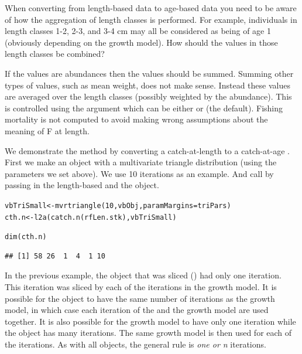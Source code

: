 \documentclass[a4paper,english,10pt]{article}\usepackage[]{graphicx}\usepackage[]{color}
\makeatletter
\newcommand{\hlnum}[1]{\textcolor[rgb]{0.063,0.58,0.627}{#1}}%
\newcommand{\hlstd}[1]{\textcolor[rgb]{0.196,0.196,0.196}{#1}}%
\newcommand{\hlkwb}[1]{\textcolor[rgb]{0.627,0,0.314}{#1}}%
\newcommand{\hlkwc}[1]{\textcolor[rgb]{0,0.631,0.314}{#1}}%
\newcommand{\hlkwd}[1]{\textcolor[rgb]{0.78,0.227,0.412}{#1}}%
\newenvironment{kframe}{%
 \def\at@end@of@kframe{}%
 \ifinner\ifhmode%
  \def\at@end@of@kframe{\end{minipage}}%
  \begin{minipage}{\columnwidth}%
 \fi\fi%
 \def\FrameCommand##1{\hskip\@totalleftmargin \hskip-\fboxsep
 \colorbox{shadecolor}{##1}\hskip-\fboxsep
     \hskip-\linewidth \hskip-\@totalleftmargin \hskip\columnwidth}%
 \MakeFramed {\advance\hsize-\width
   \@totalleftmargin\z@ \linewidth\hsize
   \@setminipage}}%
 {\par\unskip\endMakeFramed%
 \at@end@of@kframe}
\newenvironment{knitrout}{}{} %
\makeatother
\begin{document}
When converting from length-based data to age-based data you need to be aware of how the aggregation of length classes is performed. For example, individuals in length classes 1-2, 2-3, and 3-4 cm may all be considered as being of age 1 (obviously depending on the growth model). How should the values in those length classes be combined?

If the values are abundances then the values should be summed. Summing other types of values, such as mean weight, does not make sense. Instead these values are averaged over the length classes (possibly weighted by the abundance). This is controlled using the  argument which can be either  or  (the default). Fishing mortality is not computed to avoid making wrong assumptions about the meaning of F at length.

We demonstrate the method by converting a catch-at-length  to a catch-at-age . First we make an  object with a multivariate triangle distribution (using the parameters we set above). We use 10 iterations as an example. And call  by passing in the length-based  and the  object.

\begin{knitrout}
\color{fgcolor}\begin{kframe}
\begin{alltt}
\hlstd{vbTriSmall} \hlkwb{<-} \hlkwd{mvrtriangle}\hlstd{(}\hlnum{10}\hlstd{, vbObj,} \hlkwc{paramMargins} \hlstd{= triPars)}
\hlstd{cth.n} \hlkwb{<-} \hlkwd{l2a}\hlstd{(}\hlkwd{catch.n}\hlstd{(rfLen.stk), vbTriSmall)}
\end{alltt}
\end{kframe}
\end{knitrout}

\begin{knitrout}
\color{fgcolor}\begin{kframe}
\begin{alltt}
\hlkwd{dim}\hlstd{(cth.n)}
\end{alltt}
\begin{verbatim}
## [1] 58 26  1  4  1 10
\end{verbatim}
\end{kframe}
\end{knitrout}

In the previous example, the  object that was sliced () had only one iteration. This iteration was sliced by each of the iterations in the growth model. It is possible for the  object to have the same number of iterations as the growth model, in which case each iteration of the  and the growth model are used together. It is also possible for the growth model to have only one iteration while the  object has many iterations. The same growth model is then used for each of the  iterations. As with all  objects, the general rule is \emph{one or n} iterations.
\end{document}
